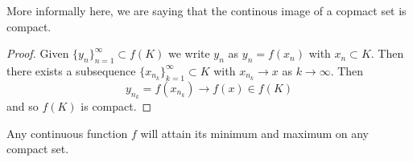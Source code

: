 \begin{remark}
    More informally here, we are saying that the continous image of a copmact set is compact.
\end{remark}

\begin{proof}
    Given $\{ y_n \}_{n = 1}^\infty \subset f(K)$ we write $y_n$ as $y_n = f(x_n)$ with $x_n \subset K$. 
    Then there exists a subsequence $\{ x_{n_k} \}_{k = 1}^\infty \subset K$ with $x_{n_k} \to x$ as $k \to \infty$. 
    Then
    \[ y_{n_k} = f(x_{n_k}) \to f(x) \in f(K) \]
    and so $f(K)$ is compact.
\end{proof}

\begin{example}
    Any continuous function $f$ will attain its minimum and maximum on any compact set.
\end{example}

